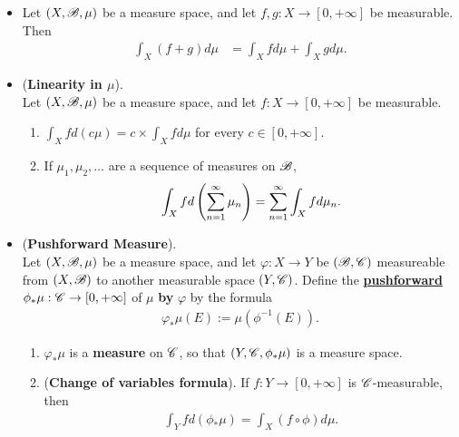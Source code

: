 \documentclass[11pt]{article}
\begin{document}
\begin{itemize}
\item \begin{theorem}
Let $(X,{\mathscr B}, \mu)$ be a measure space, and let $f, g : X \rightarrow [0, +\infty]$ be measurable. Then
\begin{align*}
\int_X (f+g) d\mu &= \int_X f d\mu + \int_X g d\mu.
\end{align*}
\end{theorem}

\item \begin{proposition} (\textbf{Linearity in $\mu$}).\\
Let $(X,{\mathscr B}, \mu)$ be a measure space, and let $f : X \rightarrow [0, +\infty]$ be measurable.
\begin{enumerate}
\item $\int_X f d(c\mu) = c \times \int_X f d\mu$ for every $c \in [0, +\infty]$.
\item If $\mu_1, \mu_2, \ldots$ are a sequence of measures on ${\mathscr B}$, 
\begin{align*}
\int_X f d\left(\sum_{n=1}^{\infty}\mu_n\right) =\sum_{n=1}^{\infty}\int_X f d\mu_n.
\end{align*}
\end{enumerate}
\end{proposition}

\item 
\begin{proposition}  (\textbf{Pushforward Measure}). \\
Let $(X,{\mathscr B}, \mu)$ be a measure space, and let $\varphi: X \rightarrow Y$ be $({\mathscr B}, {\mathscr C})$ measureable from $(X, {\mathscr B})$ to another measurable space
$(Y, {\mathscr C})$. Define the \underline{\textbf{pushforward}} $\phi_{*}\mu: {\mathscr C} \rightarrow [0, +\infty]$ of $\mu$ \textbf{by} $\varphi$ by the formula
\begin{align*}
\varphi_{*}\mu(E) := \mu(\phi^{-1}(E)).
\end{align*}
\begin{enumerate}
\item $\varphi_{*}\mu$ is a \textbf{measure} on ${\mathscr C}$, so that $(Y, {\mathscr C}, \phi_{*}\mu)$ is a measure space.
\item  (\textbf{Change of variables formula}). If $f : Y \rightarrow [0, +\infty]$ is ${\mathscr C}$-measurable, then 
\begin{align*}
\int_Y f d(\phi_{*}\mu) = \int_X (f \circ \phi) d\mu.
\end{align*}
\end{enumerate}
\end{proposition}


\end{itemize}
\end{document}
